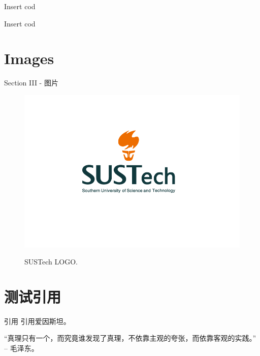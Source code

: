 \documentclass[compress, 10pt]{ctexbeamer}
\begin{document}
\begin{frame}{Insert cod}
    
\end{frame}

\begin{frame}{Insert cod}
    
\end{frame}


\section{Images}
\begin{frame}{Section III - 图片}
    \begin{figure}
        \centering
        \caption{SUSTech LOGO.}
        \includegraphics[scale=0.3]{libs/LOGO.png}
        \label{fig:ufc_emblem}
    \end{figure}
\end{frame}

\section{测试引用}
\begin{frame}{引用}
    引用爱因斯坦\cite{einstein}。
    
    “真理只有一个，而究竟谁发现了真理，不依靠主观的夸张，而依靠客观的实践。” -- 毛泽东\cite{毛泽东1949新民主主义论}。
\end{frame}
\end{document}
